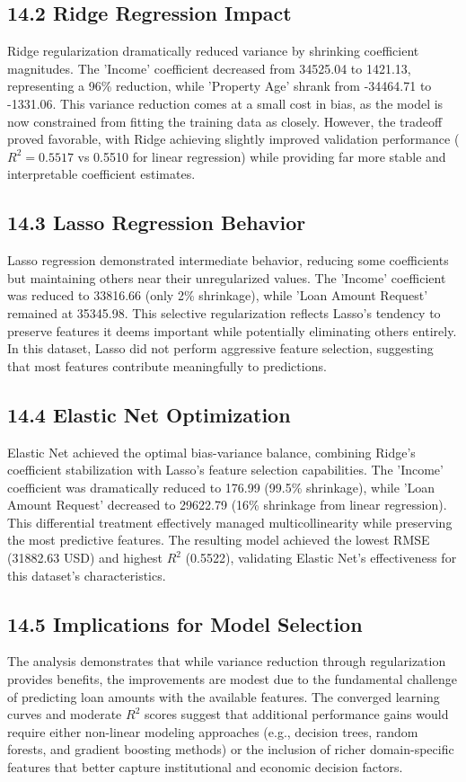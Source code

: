 \documentclass[11pt]{article}
\begin{document}
\subsection*{14.2 Ridge Regression Impact}
Ridge regularization dramatically reduced variance by shrinking coefficient magnitudes. The 'Income' coefficient decreased from 34525.04 to 1421.13, representing a 96\% reduction, while 'Property Age' shrank from -34464.71 to -1331.06. This variance reduction comes at a small cost in bias, as the model is now constrained from fitting the training data as closely. However, the tradeoff proved favorable, with Ridge achieving slightly improved validation performance ($R^2 = 0.5517$ vs 0.5510 for linear regression) while providing far more stable and interpretable coefficient estimates.

\subsection*{14.3 Lasso Regression Behavior}
Lasso regression demonstrated intermediate behavior, reducing some coefficients but maintaining others near their unregularized values. The 'Income' coefficient was reduced to 33816.66 (only 2\% shrinkage), while 'Loan Amount Request' remained at 35345.98. This selective regularization reflects Lasso's tendency to preserve features it deems important while potentially eliminating others entirely. In this dataset, Lasso did not perform aggressive feature selection, suggesting that most features contribute meaningfully to predictions.

\subsection*{14.4 Elastic Net Optimization}
Elastic Net achieved the optimal bias-variance balance, combining Ridge's coefficient stabilization with Lasso's feature selection capabilities. The 'Income' coefficient was dramatically reduced to 176.99 (99.5\% shrinkage), while 'Loan Amount Request' decreased to 29622.79 (16\% shrinkage from linear regression). This differential treatment effectively managed multicollinearity while preserving the most predictive features. The resulting model achieved the lowest RMSE (31882.63 USD) and highest $R^2$ (0.5522), validating Elastic Net's effectiveness for this dataset's characteristics.

\subsection*{14.5 Implications for Model Selection}
The analysis demonstrates that while variance reduction through regularization provides benefits, the improvements are modest due to the fundamental challenge of predicting loan amounts with the available features. The converged learning curves and moderate $R^2$ scores suggest that additional performance gains would require either non-linear modeling approaches (e.g., decision trees, random forests, and gradient boosting methods) or the inclusion of richer domain-specific features that better capture institutional and economic decision factors.
\end{document}
